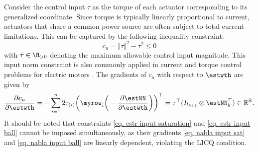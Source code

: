 \documentclass[lettersize,journal]{IEEEtran}
\newcommand*{\template}{template}
\begin{document}
\begin{appendices}
Consider the control input $\tau$ as the torque of each actuator corresponding to its generalized coordinate. Since torque is typically linearly proportional to current, actuators that share a common power source are often subject to total current limitations. This can be captured by the following inequality constraint: 
\begin{equation}
    c_{u}=\Vert\tau\Vert^2 -\bar\tau^2  \le 0
    \label{eq. cstr input ball}
\end{equation}
with $\bar\tau\in\R_{>0}$ denoting the maximum allowable control input magnitude. This input norm constraint is also commonly applied in current and torque control problems for electric motors \cite{Choi:2024aa}.
The gradients of $c_{u}$ with respect to $\estwth$ are given by
\begin{equation}
    {\partial \boldsymbol c_{u} \over \partial \estwth}
    = -\sum_{i=1}^n 2\tau_{(i)} 
    \bigg(
        \myrow_i
        \bigg(
            -{\partial \estNN\over\partial\estwth}
        \bigg)
    \bigg)^\top  
    = \tau^\top (I_{l_{k+1}}\otimes \estNN_k^\top)
    \in \mathbb R^{\Xi}.
    \label{eq. nabla input ball}
\end{equation}
It should be noted that constraints \eqref{eq. cstr input saturation} and \eqref{eq. cstr input ball} cannot be imposed simultaneously, as their gradients \eqref{eq. nabla input sat} and \eqref{eq. nabla input ball} are linearly dependent, violating the LICQ condition.

\end{appendices}

{\footnotesize

% 
}
\end{document}
